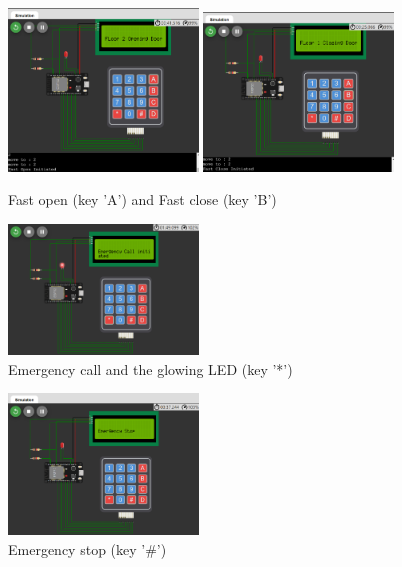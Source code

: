 \documentclass{article}
\begin{document}
\begin{figure}[!htbp] %
  \centering

  \includegraphics[width=0.45\textwidth]{img/fast_open.png}
  \includegraphics[width=0.45\textwidth]{img/fast_open_close_new.png} %
  \caption{Fast open (key 'A') and Fast close (key 'B')}
\end{figure}


\begin{figure}[!htbp] %
  \centering

  \includegraphics[width=0.45\textwidth]{img/call.png} %
  \caption{Emergency call and the glowing LED (key '*')}
\end{figure}

\begin{figure}[!htbp] %
  \centering

  \includegraphics[width=0.45\textwidth]{img/stop.png} %
  \caption{Emergency stop (key '\#')}
\end{figure}
\end{document}
